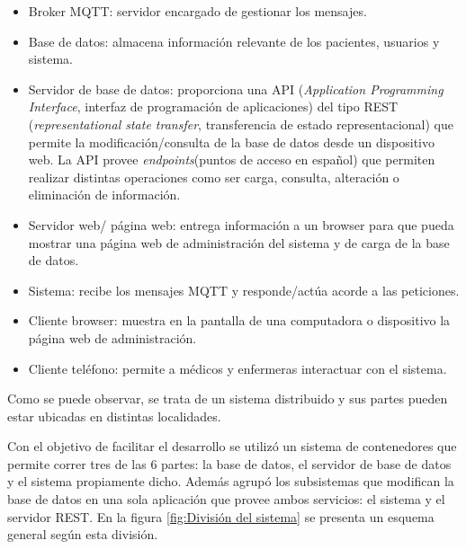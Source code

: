 \begin{itemize}
\item  Broker MQTT: servidor encargado de gestionar los mensajes.
\item  Base de datos: almacena información relevante de los pacientes, usuarios y sistema.
\item  Servidor de base de datos: proporciona una API (\textit{Application Programming Interface}, interfaz de programación de aplicaciones) del tipo REST (\textit{representational state transfer}, transferencia de estado representacional) que permite la modificación/consulta de la base de datos desde un dispositivo web. La API provee \textit{endpoints}(puntos de acceso en español) que permiten realizar distintas operaciones como ser carga, consulta, alteración o eliminación de información.
\item  Servidor web/ página web: entrega información a un browser para que pueda mostrar una página web de administración del sistema y de carga de la base de datos.
\item  Sistema: recibe los mensajes MQTT y responde/actúa acorde a las peticiones.
\item Cliente browser: muestra en la pantalla de una computadora o dispositivo la página web de administración.
\item Cliente teléfono: permite a médicos y enfermeras interactuar con el sistema.
\end{itemize}

Como se puede observar, se trata de un sistema distribuido y sus partes pueden estar ubicadas en distintas localidades.

Con el objetivo de facilitar el desarrollo se utilizó un sistema de contenedores que permite correr tres de las 6 partes: la base de datos, el servidor de base de datos y el sistema propiamente dicho. Además  agrupó los subsistemas que modifican la base de datos en una sola aplicación que provee ambos servicios: el sistema y el servidor REST. En la figura  \ref{fig:División del sistema} se presenta un esquema general según esta división.


